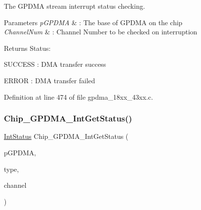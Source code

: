 The G\+P\+D\+MA stream interrupt status checking. 


\begin{DoxyParams}{Parameters}
{\em p\+G\+P\+D\+MA} & \+: The base of G\+P\+D\+MA on the chip \\
\hline
{\em Channel\+Num} & \+: Channel Number to be checked on interruption \\
\hline
\end{DoxyParams}
\begin{DoxyReturn}{Returns}
Status\+:
\begin{DoxyItemize}
\item S\+U\+C\+C\+E\+SS \+: D\+MA transfer success
\item E\+R\+R\+OR \+: D\+MA transfer failed 
\end{DoxyItemize}
\end{DoxyReturn}


Definition at line 474 of file gpdma\+\_\+18xx\+\_\+43xx.\+c.

\mbox{\label{group___g_p_d_m_a__18_x_x__43_x_x_ga06fdae68a49436b9a02d42ad85782ff4}} 
\subsubsection{\texorpdfstring{Chip\+\_\+\+G\+P\+D\+M\+A\+\_\+\+Int\+Get\+Status()}{Chip\_GPDMA\_IntGetStatus()}}
{\footnotesize\ttfamily \hyperlink{group___l_p_c___types___public___types_gab7d263072f745b4f3913fb0afc434c4e}{Int\+Status} Chip\+\_\+\+G\+P\+D\+M\+A\+\_\+\+Int\+Get\+Status (\begin{DoxyParamCaption}\item[{\hyperlink{struct_l_p_c___g_p_d_m_a___t}{L\+P\+C\+\_\+\+G\+P\+D\+M\+A\+\_\+T} $\ast$}]{p\+G\+P\+D\+MA,  }\item[{\hyperlink{group___g_p_d_m_a__18_x_x__43_x_x_ga2f4aa97bd0ffa5046c8e2b17028d99cc}{G\+P\+D\+M\+A\+\_\+\+S\+T\+A\+T\+U\+S\+\_\+T}}]{type,  }\item[{uint8\+\_\+t}]{channel }\end{DoxyParamCaption})}



